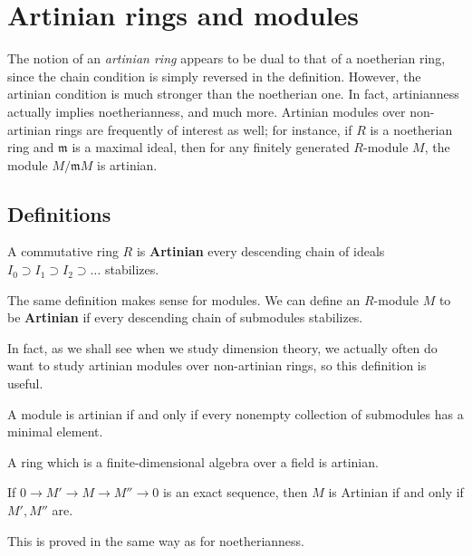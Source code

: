 \section{Artinian rings and modules}

The notion of an \emph{artinian ring}  appears to be dual to that of a
noetherian ring, since the chain condition is simply reversed in the
definition. However, the artinian condition is much stronger than the
noetherian one. In fact, 
artinianness actually implies noetherianness, and much more. 
Artinian modules over non-artinian rings are frequently of interest as well;
for instance, if $R$ is a noetherian ring and $\mathfrak{m}$ is a maximal
ideal, then for any finitely generated $R$-module $M$, the module
$M/\mathfrak{m}M$ is artinian. 

\subsection{Definitions}

\begin{definition} 
A commutative ring $R$ is \textbf{Artinian} every descending chain of ideals
$I_0 \supset I_1 \supset I_2 \supset \dots$
stabilizes.
\end{definition} 

\begin{definition}
The same definition makes sense for modules. We can define an $R$-module $M$ to
be \textbf{Artinian} if every descending chain of submodules stabilizes. 
\end{definition}

In fact, as we shall see when we study dimension theory, we actually often do
want to study artinian modules over non-artinian rings, so this definition is
useful. 

\begin{exercise} 
A module is artinian if and only if every nonempty collection of submodules
has a minimal element.
\end{exercise} 
\begin{exercise} 
A ring which is a finite-dimensional algebra over a field is artinian.
\end{exercise} 
\begin{proposition}  \label{exactartinian}
If $0 \to M' \to M \to M'' \to 0$ is an exact sequence, then $M$ is Artinian
if and only if $M', M''$ are. 
\end{proposition}

This is proved in the same way as for noetherianness.

